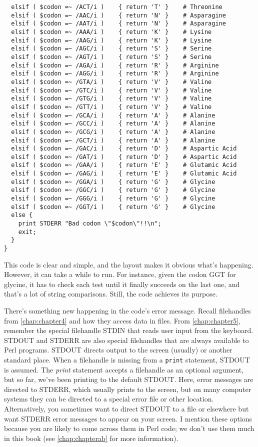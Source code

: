 \begin{lstlisting}
  elsif ( $codon =~ /ACT/i )    { return 'T' }    # Threonine
  elsif ( $codon =~ /AAC/i )    { return 'N' }    # Asparagine
  elsif ( $codon =~ /AAT/i )    { return 'N' }    # Asparagine
  elsif ( $codon =~ /AAA/i )    { return 'K' }    # Lysine
  elsif ( $codon =~ /AAG/i )    { return 'K' }    # Lysine
  elsif ( $codon =~ /AGC/i )    { return 'S' }    # Serine
  elsif ( $codon =~ /AGT/i )    { return 'S' }    # Serine
  elsif ( $codon =~ /AGA/i )    { return 'R' }    # Arginine
  elsif ( $codon =~ /AGG/i )    { return 'R' }    # Arginine
  elsif ( $codon =~ /GTA/i )    { return 'V' }    # Valine
  elsif ( $codon =~ /GTC/i )    { return 'V' }    # Valine
  elsif ( $codon =~ /GTG/i )    { return 'V' }    # Valine
  elsif ( $codon =~ /GTT/i )    { return 'V' }    # Valine
  elsif ( $codon =~ /GCA/i )    { return 'A' }    # Alanine
  elsif ( $codon =~ /GCC/i )    { return 'A' }    # Alanine
  elsif ( $codon =~ /GCG/i )    { return 'A' }    # Alanine
  elsif ( $codon =~ /GCT/i )    { return 'A' }    # Alanine
  elsif ( $codon =~ /GAC/i )    { return 'D' }    # Aspartic Acid
  elsif ( $codon =~ /GAT/i )    { return 'D' }    # Aspartic Acid
  elsif ( $codon =~ /GAA/i )    { return 'E' }    # Glutamic Acid
  elsif ( $codon =~ /GAG/i )    { return 'E' }    # Glutamic Acid
  elsif ( $codon =~ /GGA/i )    { return 'G' }    # Glycine
  elsif ( $codon =~ /GGC/i )    { return 'G' }    # Glycine
  elsif ( $codon =~ /GGG/i )    { return 'G' }    # Glycine
  elsif ( $codon =~ /GGT/i )    { return 'G' }    # Glycine
  else {
    print STDERR "Bad codon \"$codon\"!!\n";
    exit;
  }
}
\end{lstlisting}

This code is clear and simple, and the layout makes it obvious what's happening. However, it can take a while to run. For instance, given the codon GGT for glycine, it has to check each test until it finally succeeds on the last one, and that's a lot of string comparisons. Still, the code achieves its purpose.

There's something new happening in the code's error message. Recall filehandles from \autoref{chap:chapter4} and how they access data in files. From \autoref{chap:chapter5}, remember the special filehandle STDIN that reads user input from the keyboard. STDOUT and STDERR are also special filehandles that are always available to Perl programs. STDOUT directs output to the screen (usually) or another standard place. When a filehandle is missing from a \verb|print| statement, STDOUT is assumed. The \textit{print} statement accepts a filehandle as an optional argument, but so far, we've been printing to the default STDOUT. Here, error messages are directed to STDERR, which usually prints to the screen, but on many computer systems they can be directed to a special error file or other location. Alternatively, you sometimes want to direct STDOUT to a file or elsewhere but want STDERR error messages to appear on your screen. I mention these options because you are likely to come across them in Perl code; we don't use them much in this book (see \autoref{chap:chapterab} for more information).  

